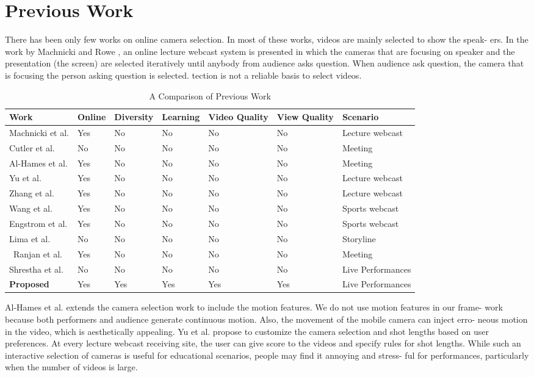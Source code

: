 \documentclass{sig-alternate}
\begin{document}
\section{Previous Work}
There has been only few works on online camera selection. In
most of these works, videos are mainly selected to show the speak-
ers. In the work by Machnicki and Rowe \cite{9}, an online lecture
webcast system is presented in which the cameras that are focusing
on speaker and the presentation (the screen) are selected iteratively
until anybody from audience asks question. When audience ask
question, the camera that is focusing the person asking question is
selected.
tection is not a reliable basis to select videos.
\begin{table}
\centering
\caption{A Comparison of Previous Work}
\begin{tabular}{|l|l|l|l|l|l|l} \hline
Work& Online &Diversity& Learning & Video Quality & View Quality& Scenario \\ \hline
Machnicki et al. \cite{9} &Yes &No&No&No&No & Lecture webcast\\ \hline
Cutler et al. \cite{6}&No&No&No&No&No&Meeting\\ \hline
Al-Hames et al. \cite{3}&Yes&No&No&No&No&Meeting\\ \hline
Yu et al. \cite{20} &Yes&No&No&No&No&Lecture webcast\\ \hline
Zhang et al. \cite{21} &Yes&No&No&No&No&Lecture webcast\\ \hline
Wang et al. \cite{16}&Yes&No&No&No&No&Sports webcast\\ \hline
Engstrom et al. \cite{8}&Yes&No&No&No&No&Sports webcast\\ \hline
Lima et al. \cite{7}&No&No&No&No&No&Storyline\\ \hline\
Ranjan et al. \cite{12}&Yes&No&No&No&No&Meeting\\ \hline
Shrestha et al. \cite{15}&No&No&No&No&No&Live Performances\\ \hline
\textbf{Proposed}\cite{15}&Yes&Yes&Yes&Yes&Yes&Live Performances\\ \hline\end{tabular}
\end{table}

Al-Hames et al. \cite{3} extends the camera selection work to include
the motion features. We do not use motion features in our frame-
work because both performers and audience generate continuous
motion. Also, the movement of the mobile camera can inject erro-
neous motion in the video, which is aesthetically appealing. Yu et
al. \cite{20} propose to customize the camera selection and shot lengths
based on user preferences. At every lecture webcast receiving site,
the user can give score to the videos and specify rules for shot
lengths. While such an interactive selection of cameras is useful
for educational scenarios, people may find it annoying and stress-
ful for performances, particularly when the number of videos is
large.
\end{document}
